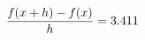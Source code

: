 \documentclass[preview]{standalone}
\begin{document}
\begin{align*}
\special{dvisvgm:raw <g id='unique000'>}\frac{f(x+h)-f(x)}{h} = 3.411\special{dvisvgm:raw </g>}
\end{align*}
\end{document}
